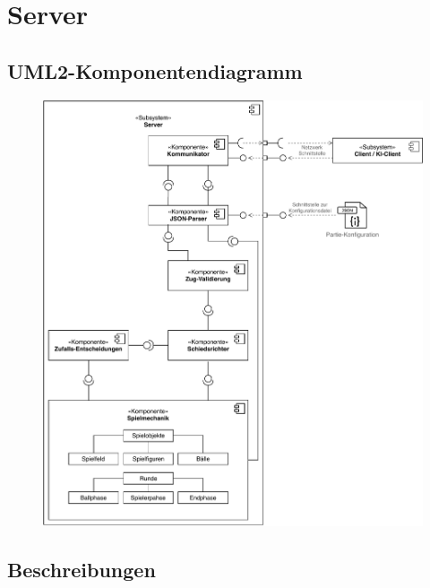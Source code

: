 \section{Server}

	\subsection{UML2-Komponentendiagramm}

		\begin{figure}[H]
    		\centering
    		\includegraphics[scale=0.75]{images/Server-Architektur_DrawIO-Gesammt.pdf}
		\end{figure}

	\subsection{Beschreibungen}

